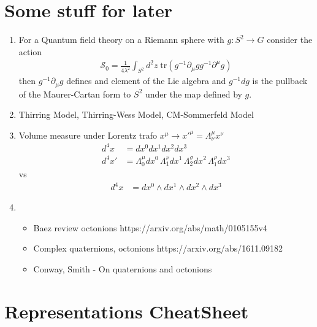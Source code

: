 \documentclass[10pt,a4paper]{article}
\theoremstyle{definition}
\begin{document}
\section{Some stuff for later}
\begin{enumerate}
    \item For a Quantum field theory on a Riemann sphere with $g:S^2\rightarrow G$ consider the action 
    \begin{align}
        \mathcal{S}_0=\frac{1}{4\lambda^2}\int_{S^2}d^2z\;\text{tr}(g^{-1}\partial_\mu g g^{-1}\partial^\mu g)
    \end{align}
    then $g^{-1}\partial_\mu g$ defines and element of the Lie algebra and $g^{-1}dg$ is the pullback of the Maurer-Cartan form to $S^2$ under the map defined by $g$.
    \item Thirring Model, Thirring-Wess Model, CM-Sommerfeld Model
    \item Volume measure under Lorentz trafo $x^\mu\rightarrow x'^\mu=\Lambda^\mu_\nu x^\nu$
    \begin{align}
        d^4x
        &=dx^0dx^1dx^2dx^3\\
        d^4x'&=\Lambda^\mu_0dx^0\,\Lambda^\nu_1dx^1\,\Lambda^\sigma_2dx^2\,\Lambda^\rho_1dx^3
    \end{align}
    vs
    \begin{align}
        d^4x
        &=dx^0\wedge dx^1\wedge dx^2\wedge dx^3
    \end{align}
    \item 
    \begin{itemize}
        \item Baez review octonions {\sc https://arxiv.org/abs/math/0105155v4}
        \item Complex quaternions, octonions {\sc https://arxiv.org/abs/1611.09182}
        \item Conway, Smith - On quaternions and octonions
    \end{itemize}
\end{enumerate}


\newpage
\section{Representations CheatSheet}
\end{document}
